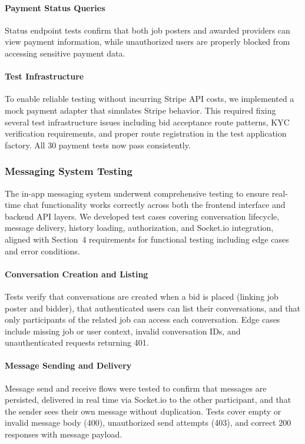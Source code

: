 \documentclass[11pt]{article}
\begin{document}
\paragraph{Payment Status Queries}
Status endpoint tests confirm that both job posters and awarded providers can view payment information, while unauthorized users are properly blocked from accessing sensitive payment data.

\paragraph{Test Infrastructure}
To enable reliable testing without incurring Stripe API costs, we implemented a mock payment adapter that simulates Stripe behavior. This required fixing several test infrastructure issues including bid acceptance route patterns, KYC verification requirements, and proper route registration in the test application factory. All 30 payment tests now pass consistently.

\subsubsection{Messaging System Testing}
The in-app messaging system underwent comprehensive testing to ensure real-time chat functionality works correctly across both the frontend interface and backend API layers. We developed test cases covering conversation lifecycle, message delivery, history loading, authorization, and Socket.io integration, aligned with Section~4 requirements for functional testing including edge cases and error conditions.

\paragraph{Conversation Creation and Listing}
Tests verify that conversations are created when a bid is placed (linking job poster and bidder), that authenticated users can list their conversations, and that only participants of the related job can access each conversation. Edge cases include missing job or user context, invalid conversation IDs, and unauthenticated requests returning 401.

\paragraph{Message Sending and Delivery}
Message send and receive flows were tested to confirm that messages are persisted, delivered in real time via Socket.io to the other participant, and that the sender sees their own message without duplication. Tests cover empty or invalid message body (400), unauthorized send attempts (403), and correct 200 responses with message payload.
\end{document}
